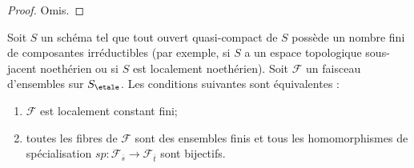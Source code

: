 \begin{proof}
Omis.
\end{proof}

\begin{lemma}
\label{lemma-characterize-locally-constant}
Soit $S$ un schéma tel que tout ouvert quasi-compact de $S$ possède
un nombre fini de composantes irréductibles (par exemple, si $S$ a un
espace topologique sous-jacent noethérien ou si $S$ est localement noethérien).
Soit $\mathcal{F}$ un faisceau d'ensembles sur $S_\etale$.
Les conditions suivantes sont équivalentes :
\begin{enumerate}
\item $\mathcal{F}$ est localement constant fini;
\item toutes les fibres de $\mathcal{F}$ sont des ensembles finis et tous les homomorphismes
de spécialisation $sp : \mathcal{F}_{\overline{s}} \to \mathcal{F}_{\overline{t}}$
sont bijectifs.
\end{enumerate}
\end{lemma}

